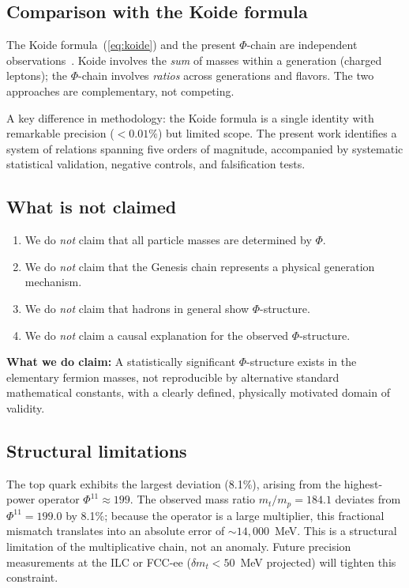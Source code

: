 \documentclass[11pt,a4paper]{article}
\begin{document}
\subsection{Comparison with the Koide formula}
\label{sec:koide_comparison}

The Koide formula~(\ref{eq:koide}) and the present $\Phi$-chain are
independent observations~\cite{Koide1982,Koide1983}. Koide involves the \emph{sum} of masses
within a generation (charged leptons); the $\Phi$-chain involves
\emph{ratios} across generations and flavors. The two approaches are
complementary, not competing.

A key difference in methodology: the Koide formula is a single
identity with remarkable precision ($< 0.01\%$) but limited scope.
The present work identifies a system of relations spanning five orders
of magnitude, accompanied by systematic statistical validation,
negative controls, and falsification tests.

\subsection{What is not claimed}
\label{sec:nonclaims}

\begin{enumerate}
  \item We do \emph{not} claim that all particle masses are
        determined by $\Phi$.
  \item We do \emph{not} claim that the Genesis chain represents a
        physical generation mechanism.
  \item We do \emph{not} claim that hadrons in general show
        $\Phi$-structure.
  \item We do \emph{not} claim a causal explanation for the observed
        $\Phi$-structure.
\end{enumerate}

\noindent
\textbf{What we do claim:} A statistically significant
$\Phi$-structure exists in the elementary
fermion masses, not reproducible by alternative standard mathematical
constants, with a clearly defined, physically motivated domain
of validity.

\subsection{Structural limitations}
\label{sec:limitations}

The top quark exhibits the largest deviation (8.1\%), arising from
the highest-power operator $\Phi^{11} \approx 199$. The observed mass
ratio $m_t / m_p = 184.1$ deviates from $\Phi^{11} = 199.0$ by 8.1\%;
because the operator is a large multiplier, this fractional mismatch
translates into an absolute error of $\sim 14{,}000$~MeV. This is a
structural limitation of the multiplicative chain, not an anomaly.
Future precision measurements at the ILC or FCC-ee
($\delta m_t < 50$~MeV projected) will tighten this constraint.
\end{document}
